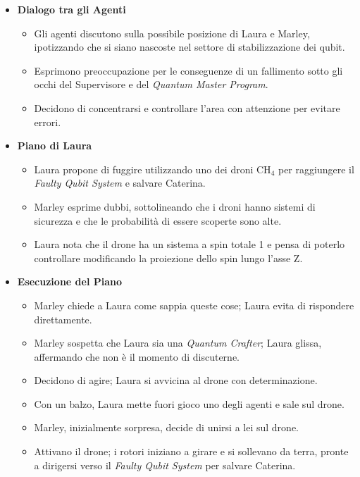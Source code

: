 \begin{itemize}
    \item \textbf{Dialogo tra gli Agenti}
    \begin{itemize}
        \item Gli agenti discutono sulla possibile posizione di Laura e Marley, ipotizzando che si siano nascoste nel settore di stabilizzazione dei qubit.
        \item Esprimono preoccupazione per le conseguenze di un fallimento sotto gli occhi del Supervisore e del \emph{Quantum Master Program}.
        \item Decidono di concentrarsi e controllare l'area con attenzione per evitare errori.
    \end{itemize}
\end{itemize}


\begin{itemize}
    \item \textbf{Piano di Laura}
    \begin{itemize}
        \item Laura propone di fuggire utilizzando uno dei droni CH$_4$ per raggiungere il \emph{Faulty Qubit System} e salvare Caterina.
        \item Marley esprime dubbi, sottolineando che i droni hanno sistemi di sicurezza e che le probabilità di essere scoperte sono alte.
        \item Laura nota che il drone ha un sistema a spin totale 1 e pensa di poterlo controllare modificando la proiezione dello spin lungo l'asse Z.
    \end{itemize}
    \item \textbf{Esecuzione del Piano}
    \begin{itemize}
        \item Marley chiede a Laura come sappia queste cose; Laura evita di rispondere direttamente.
        \item Marley sospetta che Laura sia una \emph{Quantum Crafter}; Laura glissa, affermando che non è il momento di discuterne.
        \item Decidono di agire; Laura si avvicina al drone con determinazione.
        \item Con un balzo, Laura mette fuori gioco uno degli agenti e sale sul drone.
        \item Marley, inizialmente sorpresa, decide di unirsi a lei sul drone.
        \item Attivano il drone; i rotori iniziano a girare e si sollevano da terra, pronte a dirigersi verso il \emph{Faulty Qubit System} per salvare Caterina.
    \end{itemize}
\end{itemize}
